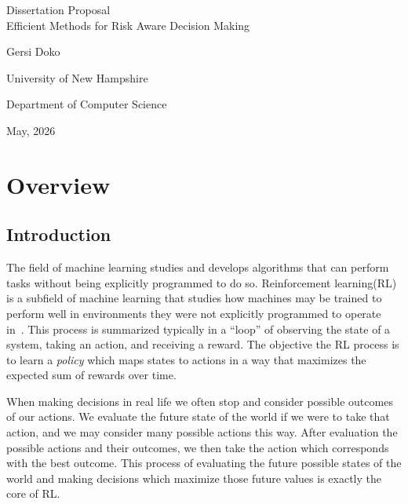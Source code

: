 \documentclass[12pt,letterpaper,oneside]{report}
\newcommand{\proposaltitle}{Efficient Methods for Risk Aware Decision Making}
\newcommand{\proposalauthor}{Gersi Doko}
\newcommand{\proposaldate}{May, 2026}
\theoremstyle{plain}
\theoremstyle{definition}
\theoremstyle{remark}
\begin{document}
\begin{titlepage}
  \centering
  \singlespacing
  \vspace*{1.5in}
  Dissertation Proposal\\
  \proposaltitle\par
  \vfill
  \proposalauthor\par
  \bigskip
  University of New Hampshire\par
  Department of Computer Science\par
  \vfill
  \proposaldate\par
  \vspace*{1in}
\end{titlepage}


\setcounter{page}{1}

\chapter{Overview}\label{ch:overview}

\section{Introduction}\label{sec:overview-intro}

The field of machine learning studies and develops algorithms that can perform tasks without being explicitly programmed to do so. Reinforcement learning(RL) is a subfield of machine learning that studies how machines may be trained to perform well in environments they were not explicitly programmed to operate in~\citet{Sutton1998}. This process is summarized typically in a ``loop'' of observing the state of a system, taking an action, and receiving a reward. The objective the RL process is to learn a \emph{policy} which maps states to actions in a way that maximizes the expected sum of rewards over time.

When making decisions in real life we often stop and consider possible outcomes of our actions. We evaluate the future state of the world if we were to take that action, and we may consider many possible actions this way. After evaluation the possible actions and their outcomes, we then take the action which corresponds with the best outcome. This process of evaluating the future possible states of the world and making decisions which maximize those future values is exactly the core of RL.
\end{document}
